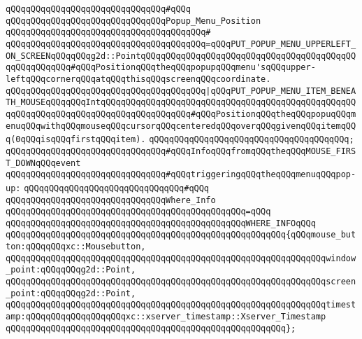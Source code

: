 \verb|qQQqqQQqqQQqqQQqqQQqqQQqqQQqqQQq#qQQq|\newline
\verb|qQQqqQQqqQQqqQQqqQQqqQQqqQQqqQQqPopup_Menu_Position|\newline
\verb|qQQqqQQqqQQqqQQqqQQqqQQqqQQqqQQqqQQqqQQq#|\newline
\verb|qQQqqQQqqQQqqQQqqQQqqQQqqQQqqQQqqQQqqQQq=qQQqPUT_POPUP_MENU_UPPERLEFT_ON_SCREENqQQqqQQqg2d::PointqQQqqQQqqQQqqQQqqQQqqQQqqQQqqQQqqQQqqQQqqQQqqQQqqQQqqQQq#qQQqPositionqQQqtheqQQqpopupqQQqmenu'sqQQqupper-leftqQQqcornerqQQqatqQQqthisqQQqscreenqQQqcoordinate.|\newline
\verb|qQQqqQQqqQQqqQQqqQQqqQQqqQQqqQQqqQQqqQQq|\verb#|qQQqPUT_POPUP_MENU_ITEM_BENEATH_MOUSEqQQqqQQqIntqQQqqQQqqQQqqQQqqQQqqQQqqQQqqQQqqQQqqQQqqQQqqQQqqQQqqQQqqQQqqQQqqQQqqQQqqQQqqQQqqQQqqQQq#\verb|#qQQqPositionqQQqtheqQQqpopuqQQqmenuqQQqwithqQQqmouseqQQqcursorqQQqcenteredqQQqoverqQQqgivenqQQqitemqQQq(0qQQqisqQQqfirstqQQqitem).|\newline
\verb|qQQqqQQqqQQqqQQqqQQqqQQqqQQqqQQqqQQqqQQq;|\newline
\newline
\verb|qQQqqQQqqQQqqQQqqQQqqQQqqQQqqQQq#qQQqInfoqQQqfromqQQqtheqQQqMOUSE_FIRST_DOWNqQQqevent|\newline
\verb|qQQqqQQqqQQqqQQqqQQqqQQqqQQqqQQq#qQQqtriggeringqQQqtheqQQqmenuqQQqpop-up:|\newline
\verb|qQQqqQQqqQQqqQQqqQQqqQQqqQQqqQQq#qQQq|\newline
\verb|qQQqqQQqqQQqqQQqqQQqqQQqqQQqqQQqWhere_Info|\newline
\verb|qQQqqQQqqQQqqQQqqQQqqQQqqQQqqQQqqQQqqQQqqQQqqQQq=qQQq|\newline
\verb|qQQqqQQqqQQqqQQqqQQqqQQqqQQqqQQqqQQqqQQqqQQqqQQqWHERE_INFOqQQq|\newline
\verb|qQQqqQQqqQQqqQQqqQQqqQQqqQQqqQQqqQQqqQQqqQQqqQQqqQQqqQQq{qQQqmouse_button:qQQqqQQqxc::Mousebutton,|\newline
\verb|qQQqqQQqqQQqqQQqqQQqqQQqqQQqqQQqqQQqqQQqqQQqqQQqqQQqqQQqqQQqqQQqwindow_point:qQQqqQQqg2d::Point,|\newline
\verb|qQQqqQQqqQQqqQQqqQQqqQQqqQQqqQQqqQQqqQQqqQQqqQQqqQQqqQQqqQQqqQQqscreen_point:qQQqqQQqg2d::Point,|\newline
\verb|qQQqqQQqqQQqqQQqqQQqqQQqqQQqqQQqqQQqqQQqqQQqqQQqqQQqqQQqqQQqqQQqtimestamp:qQQqqQQqqQQqqQQqqQQqxc::xserver_timestamp::Xserver_Timestamp|\newline
\verb|qQQqqQQqqQQqqQQqqQQqqQQqqQQqqQQqqQQqqQQqqQQqqQQqqQQqqQQq};|\newline
\newline

